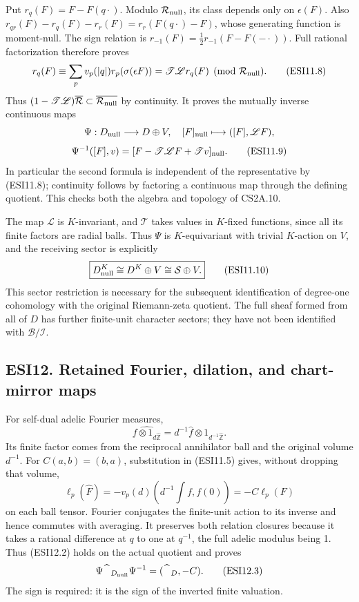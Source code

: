 Put \(r_q(F)=F-F(q\cdot)\). Modulo \(\mathcal R_{\rm null}\), its class
depends only on \(\epsilon(F)\). Also
\(r_{qr}(F)-r_q(F)-r_r(F)=r_r(F(q\cdot)-F)\), whose generating function
is moment-null. The sign relation is
\(r_{-1}(F)=\tfrac12r_{-1}(F-F(-\cdot))\). Full rational factorization
therefore proves \[
r_q(F)\equiv\sum_p v_p(|q|)r_p(\sigma(\epsilon F))
=\mathscr T\mathscr Lr_q(F)
\pmod{\mathcal R_{\rm null}}.
\tag{ESI11.8}
\] Thus
\((1-\mathscr T\mathscr L)\overline{\mathcal R}\subset\overline{\mathcal R_{\rm null}}\)
by continuity. It proves the mutually inverse continuous maps \[
\Psi:D_{\rm null}\longrightarrow D\oplus V,
\quad [F]_{\rm null}\longmapsto([F],\mathscr LF),
\] \[
\Psi^{-1}([F],v)=[F-\mathscr T\mathscr LF+\mathscr T v]_{\rm null}.
\tag{ESI11.9}
\] In particular the second formula is independent of the representative
by (ESI11.8); continuity follows by factoring a continuous map through
the defining quotient. This checks both the algebra and topology of
CS2A.10.

The map \(\mathscr L\) is \(K\)-invariant, and \(\mathscr T\) takes
values in \(K\)-fixed functions, since all its finite factors are radial
balls. Thus \(\Psi\) is \(K\)-equivariant with trivial \(K\)-action on
\(V\), and the receiving sector is explicitly \[
\boxed{D_{\rm null}^{K}\cong D^{K}\oplus V\cong\mathcal S\oplus V.}
\tag{ESI11.10}
\] This sector restriction is necessary for the subsequent
identification of degree-one cohomology with the original Riemann-zeta
quotient. The full sheaf formed from all of \(D\) has further
finite-unit character sectors; they have not been identified with
\(\mathcal B/\mathcal I\).

\subsection{ESI12. Retained Fourier, dilation, and chart-mirror
maps}\label{esi12.-retained-fourier-dilation-and-chart-mirror-maps}

For self-dual adelic Fourier measures, \[
\widehat{f\otimes1_{d\widehat{\mathbb Z}}}
=d^{-1}\widehat f\otimes1_{d^{-1}\widehat{\mathbb Z}}.
\tag{ESI12.1}
\] Its finite factor comes from the reciprocal annihilator ball and the
original volume \(d^{-1}\). For \(C(a,b)=(b,a)\), substitution in
(ESI11.5) gives, without dropping that volume, \[
\ell_p(\widehat F)
=-v_p(d)\left(d^{-1}\int f,f(0)\right)
=-C\ell_p(F)
\tag{ESI12.2}
\] on each ball tensor. Fourier conjugates the finite-unit action to its
inverse and hence commutes with averaging. It preserves both relation
closures because it takes a rational difference at \(q\) to one at
\(q^{-1}\), the full adelic modulus being 1. Thus (ESI12.2) holds on the
actual quotient and proves \[
\Psi\widehat{\phantom F}_{D_{\rm null}}\Psi^{-1}
=(\widehat{\phantom F}_D,-C).
\tag{ESI12.3}
\] The sign is required: it is the sign of the inverted finite
valuation.

